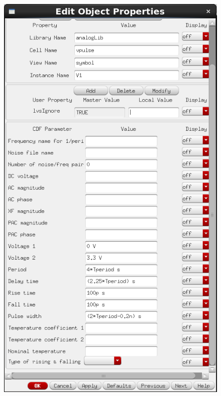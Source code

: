\begin{figure}[h]
\begin{multicols}{3}
    \includegraphics[width=1\linewidth]{figures/In2Config.PNG}\par

\end{multicols}
\end{figure}
